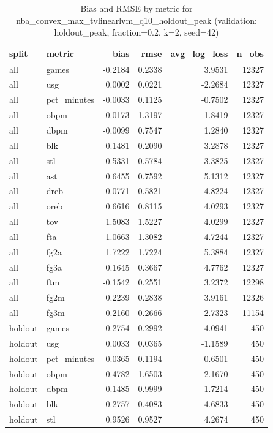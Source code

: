 \begin{table}
\caption{Bias and RMSE by metric for nba_convex_max_tvlinearlvm_q10_holdout_peak (validation: holdout_peak, fraction=0.2, k=2, seed=42)}
\label{tab:nba_convex_max_tvlinearlvm_q10_holdout_peak_vs_holdout_peak_f20_k2_s42_bias_rmse}
\begin{tabular}{llrrrr}
\toprule
split & metric & bias & rmse & avg\_log\_loss & n\_obs \\
\midrule
all & games & -0.2184 & 0.2338 & 3.9531 & 12327 \\
all & usg & 0.0002 & 0.0221 & -2.2684 & 12327 \\
all & pct\_minutes & -0.0033 & 0.1125 & -0.7502 & 12327 \\
all & obpm & -0.0173 & 1.3197 & 1.8419 & 12327 \\
all & dbpm & -0.0099 & 0.7547 & 1.2840 & 12327 \\
all & blk & 0.1481 & 0.2090 & 3.2878 & 12327 \\
all & stl & 0.5331 & 0.5784 & 3.3825 & 12327 \\
all & ast & 0.6455 & 0.7592 & 5.1312 & 12327 \\
all & dreb & 0.0771 & 0.5821 & 4.8224 & 12327 \\
all & oreb & 0.6616 & 0.8115 & 4.0293 & 12327 \\
all & tov & 1.5083 & 1.5227 & 4.0299 & 12327 \\
all & fta & 1.0663 & 1.3082 & 4.7244 & 12327 \\
all & fg2a & 1.7222 & 1.7224 & 5.3884 & 12327 \\
all & fg3a & 0.1645 & 0.3667 & 4.7762 & 12327 \\
all & ftm & -0.1542 & 0.2551 & 3.2372 & 12298 \\
all & fg2m & 0.2239 & 0.2838 & 3.9161 & 12326 \\
all & fg3m & 0.2160 & 0.2666 & 2.7323 & 11154 \\
holdout & games & -0.2754 & 0.2992 & 4.0941 & 450 \\
holdout & usg & 0.0033 & 0.0365 & -1.1589 & 450 \\
holdout & pct\_minutes & -0.0365 & 0.1194 & -0.6501 & 450 \\
holdout & obpm & -0.4782 & 1.6503 & 2.1670 & 450 \\
holdout & dbpm & -0.1485 & 0.9999 & 1.7214 & 450 \\
holdout & blk & 0.2757 & 0.4083 & 4.6833 & 450 \\
holdout & stl & 0.9526 & 0.9527 & 4.2674 & 450 \\

\end{tabular}
\end{table}

